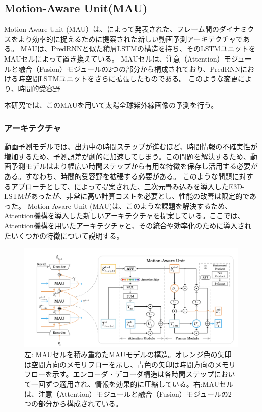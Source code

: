     \subsection{Motion-Aware Unit(MAU)}
      Motion-Aware Unit (MAU）は、によって発表された、フレーム間のダイナミクスをより効率的に捉えるために提案された新しい動画予測アーキテクチャである。
      MAUは、PredRNNと似た積層LSTMの構造を持ち、そのLSTMユニットをMAUセルによって置き換えている。
      MAUセルは、注意（Attention）モジュールと融合（Fusion）モジュールの2つの部分から構成されており、PredRNNにおける時空間LSTMユニットをさらに拡張したものである。
      このような変更により、時間的受容野

      本研究では、このMAUを用いて太陽全球紫外線画像の予測を行う。
      
      \subsubsection{アーキテクチャ}
      動画予測モデルでは、出力中の時間ステップが進むほど、時間情報の不確実性が増加するため、予測誤差が劇的に加速してしまう。この問題を解決するため、動画予測モデルはより幅広い時間ステップから有用な特徴を保存し活用する必要がある。すなわち、時間的受容野を拡張する必要がある。
      このような問題に対するアプローチとして、によって提案された、三次元畳み込みを導入したE3D-LSTMがあったが、非常に高い計算コストを必要とし、性能の改善は限定的であった。
      Motion-Aware Unit (MAU)は、このような課題を解決するため、Attention機構を導入した新しいアーキテクチャを提案している。ここでは、Attention機構を用いたアーキテクチャと、その統合や効率化のために導入されたいくつかの特徴について説明する。
      
      \begin{figure}[htbp]
        \begin{center}
          \includegraphics[width=160mm]{figures/videoprediction/mau.png}
          \caption{左: MAUセルを積み重ねたMAUモデルの構造。オレンジ色の矢印は空間方向のメモリフローを示し、青色の矢印は時間方向のメモリフローを示す。エンコーダ・デコーダ構造は各時間ステップにおいて一回ずつ適用され、情報を効果的に圧縮している。右:MAUセルは、注意（Attention）モジュールと融合（Fusion）モジュールの2つの部分から構成されている。}
          \label{fig:mau_attention}
        \end{center}
      \end{figure}
        
